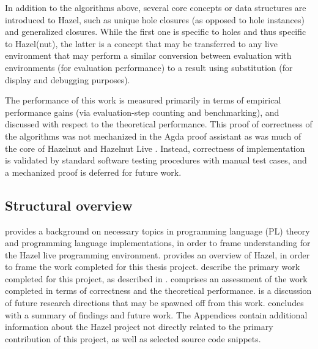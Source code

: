 In addition to the algorithms above, several core concepts or data structures are introduced to Hazel, such as unique hole closures (as opposed to hole instances) and generalized closures. While the first one is specific to holes and thus specific to Hazel(nut), the latter is a concept that may be transferred to any live environment that may perform a similar conversion between evaluation with environments (for evaluation performance) to a result using substitution (for display and debugging purposes).

The performance of this work is measured primarily in terms of empirical performance gains (via evaluation-step counting and benchmarking), and discussed with respect to the theoretical performance. This proof of correctness of the algorithms was not mechanized in the Agda proof assistant as was much of the core of Hazelnut \cite{conf/popl/Hazelnut17} and Hazelnut Live \cite{conf/popl/HazelnutLive19}. Instead, correctness of implementation is validated by standard software testing procedures with manual test cases, and a mechanized proof is deferred for future work.

\subsection{Structural overview}
\label{sec:structural_overview}


 provides a background on necessary topics in programming language (PL) theory and programming language implementations, in order to frame understanding for the Hazel live programming environment.  provides an overview of Hazel, in order to frame the work completed for this thesis project.  describe the primary work completed for this project, as described in .  comprises an assessment of the work completed in terms of correctness and the theoretical performance.  is a discussion of future research directions that may be spawned off from this work.  concludes with a summary of findings and future work. The Appendices contain additional information about the Hazel project not directly related to the primary contribution of this project, as well as selected source code snippets.

